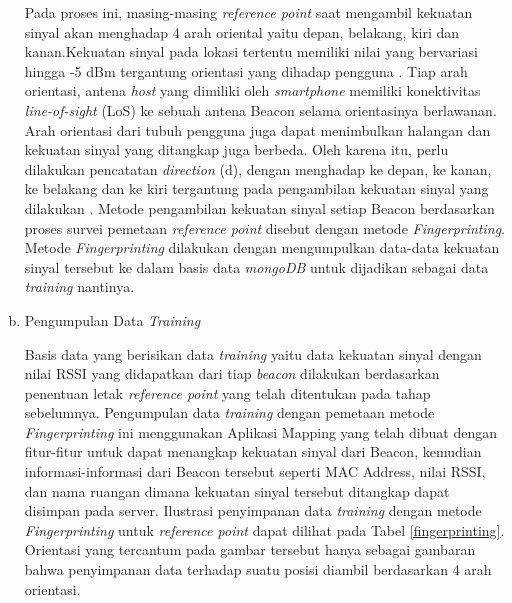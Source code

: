 \begin{enumerate}[a.]
	      \par Pada proses ini, masing-masing \textit{reference point} saat mengambil kekuatan sinyal akan menghadap 4 arah oriental yaitu depan, belakang, kiri dan kanan.Kekuatan sinyal pada lokasi tertentu memiliki nilai yang bervariasi hingga -5 dBm tergantung orientasi yang dihadap pengguna \cite{Bahl2000}. Tiap arah orientasi, antena \textit{host} yang dimiliki oleh \textit{smartphone} memiliki konektivitas \textit{line-of-sight} (LoS) ke sebuah antena Beacon selama orientasinya berlawanan. Arah orientasi dari tubuh pengguna juga dapat menimbulkan halangan dan kekuatan sinyal yang ditangkap juga berbeda. Oleh karena itu, perlu dilakukan pencatatan \textit{direction} (d), dengan menghadap ke depan, ke kanan, ke belakang dan ke kiri tergantung pada pengambilan kekuatan sinyal yang dilakukan \citep{christ1993}. Metode pengambilan kekuatan sinyal setiap Beacon berdasarkan proses survei pemetaan \textit{reference point} disebut dengan metode \textit{Fingerprinting}. Metode \textit{Fingerprinting} dilakukan dengan mengumpulkan  data-data kekuatan sinyal tersebut ke dalam basis data \textit{mongoDB} untuk dijadikan sebagai data \textit{training} nantinya.

	\item Pengumpulan Data \textit{Training}
	      \par
	      Basis data yang berisikan data \textit {training} yaitu data kekuatan sinyal dengan nilai RSSI yang didapatkan dari tiap \textit{beacon} dilakukan berdasarkan penentuan letak \textit{reference point} yang telah ditentukan pada tahap sebelumnya. Pengumpulan data \textit{training} dengan pemetaan metode \textit{Fingerprinting} ini menggunakan Aplikasi Mapping yang telah dibuat dengan fitur-fitur untuk dapat menangkap kekuatan sinyal dari Beacon, kemudian informasi-informasi dari Beacon tersebut seperti MAC Address, nilai RSSI, dan nama ruangan dimana kekuatan sinyal tersebut ditangkap dapat disimpan pada server. Ilustrasi penyimpanan data \textit{training} dengan metode \textit{Fingerprinting} untuk \textit{reference point} dapat dilihat pada Tabel \ref{fingerprinting}. Orientasi yang tercantum pada gambar tersebut hanya sebagai gambaran bahwa penyimpanan data terhadap suatu posisi diambil berdasarkan 4 arah orientasi.


\end{enumerate}
